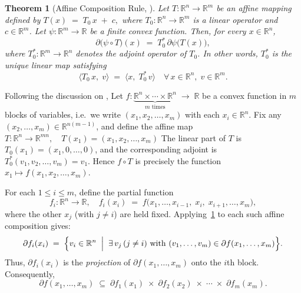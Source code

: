 \documentclass[12pt]{article}
\theoremstyle{plain}
\newtheorem{theorem}{Theorem}[section]
\theoremstyle{definition}
\begin{document}
\begin{theorem}[Affine Composition Rule, {\cite[Theorem 4.2.1, p.263]{HiLe96}}]\label{affinetheorem}
	Let  $T: \mathbb{R}^n \to \mathbb{R}^m$ 
	be an affine mapping defined by $T(x) \;=\; T_0 \,x \;+\; c,$ where  	$T_0: \mathbb{R}^n \to \mathbb{R}^m$
	is a linear operator and  \(c \in \mathbb{R}^m\).  
	Let \(\psi: \mathbb{R}^m \to \mathbb{R}\) be a finite convex function. Then, for every \(x \in \mathbb{R}^n\),
	\[
	\partial\bigl(\psi\circ T\bigr)(x)
	\;=\;
	T_0^*\,\partial \psi\bigl(T(x)\bigr),
	\]
	where $T_0^*: \mathbb{R}^m \to \mathbb{R}^n$
	denotes the adjoint operator of \(T_0\). In other words, \(T_0^*\) is the unique linear map satisfying
	\[
	\langle T_0\,x,\; v \rangle
	\;=\;
	\langle x,\; T_0^*\,v \rangle
	\quad
	\forall\, x \in \mathbb{R}^n,\; v \in \mathbb{R}^m.
	\]
\end{theorem}

Following the discussion on \cite[p.\ 263]{HiLe96}, Let $f: \underbrace{\mathbb{R}^n \times \cdots \times \mathbb{R}^n}_{m\text{ times}}	\;\longrightarrow\; \mathbb{R}$
be a convex function in \(m\) blocks of variables, i.e.\ we write 
\((x_1, x_2, \dots, x_m)\) with each \(x_i \in \mathbb{R}^n\).  
Fix any \((x_2,\dots,x_m) \in \mathbb{R}^{n(m-1)}\), and define the affine map $ T: \mathbb{R}^n \to \mathbb{R}^{mn},\quad T(x_1) = (x_1, x_2, \dots, x_m)$ 
The linear part of \( T \) is \( T_0(x_1) = (x_1, 0, \dots, 0) \), and the corresponding adjoint is \( T_0^*(v_1, v_2, \dots, v_m) = v_1 \). Hence \( f \circ T \) is precisely the function \( x_1 \mapsto f(x_1, x_2, \dots, x_m) \).

\medskip

For each \(1 \le i \le m\), define the partial function
\[
f_i: \mathbb{R}^n \to \mathbb{R},
\quad
f_i(x_i) 
\;=\;
f\bigl(x_1,\dots,x_{i-1},\;x_i,\;x_{i+1},\dots,x_m\bigr),
\]
where the other \(x_j\) (with \(j \neq i\)) are held fixed. Applying~\ref{affinetheorem} to each such affine composition gives:
\[
\partial f_i(x_i)
\;=\;
\Bigl\{
v_i \in \mathbb{R}^n 
\;\Bigm|\;
\exists\,v_j \,(j\neq i)\text{ with }(v_1,\dots,v_m)\in \partial f(x_1,\dots,x_m)
\Bigr\}.
\]
Thus, \(\partial f_i(x_i)\) is the \emph{projection} of \(\partial f(x_1,\dots,x_m)\) onto the \(i\)th block. Consequently,
\begin{equation}\label{subset_inclusion}
	\partial f(x_1,\dots,x_m)
	\;\subseteq\;
	\partial f_1(x_1)
	\;\times\;
	\partial f_2(x_2)
	\;\times\;
	\cdots
	\;\times\;
	\partial f_m(x_m).
\end{equation}
\end{document}
